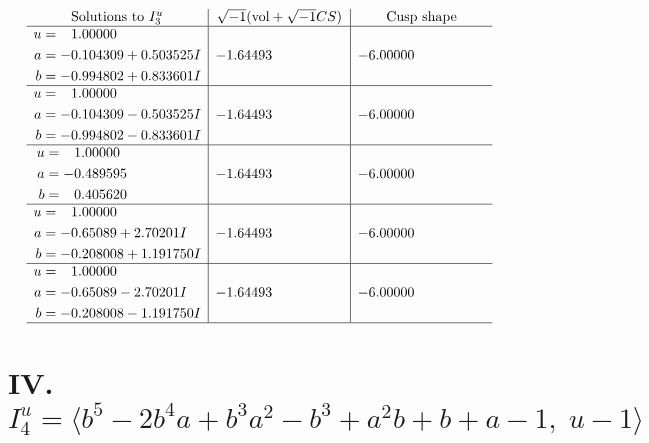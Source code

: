 \documentclass[1p]{elsarticle_modified}
\theoremstyle{definition}
\newcommand{\I}{\sqrt{-1}}
\begin{document}
$$\begin{array}{c|c|c}  
\text{Solutions to }I^u_{3}& \I (\text{vol} + \sqrt{-1}CS) & \text{Cusp shape}\\
 \hline 
\begin{aligned}
u &= \phantom{-}1.00000\phantom{ +0.000000I} \\
a &= -0.104309 + 0.503525 I \\
b &= -0.994802 + 0.833601 I\end{aligned}
 & -1.64493\phantom{ +0.000000I} & -6.00000\phantom{ +0.000000I} \\ \hline\begin{aligned}
u &= \phantom{-}1.00000\phantom{ +0.000000I} \\
a &= -0.104309 - 0.503525 I \\
b &= -0.994802 - 0.833601 I\end{aligned}
 & -1.64493\phantom{ +0.000000I} & -6.00000\phantom{ +0.000000I} \\ \hline\begin{aligned}
u &= \phantom{-}1.00000\phantom{ +0.000000I} \\
a &= -0.489595\phantom{ +0.000000I} \\
b &= \phantom{-}0.405620\phantom{ +0.000000I}\end{aligned}
 & -1.64493\phantom{ +0.000000I} & -6.00000\phantom{ +0.000000I} \\ \hline\begin{aligned}
u &= \phantom{-}1.00000\phantom{ +0.000000I} \\
a &= -0.65089 + 2.70201 I \\
b &= -0.208008 + 1.191750 I\end{aligned}
 & -1.64493\phantom{ +0.000000I} & -6.00000\phantom{ +0.000000I} \\ \hline\begin{aligned}
u &= \phantom{-}1.00000\phantom{ +0.000000I} \\
a &= -0.65089 - 2.70201 I \\
b &= -0.208008 - 1.191750 I\end{aligned}
 & -1.64493\phantom{ +0.000000I} & -6.00000\phantom{ +0.000000I}\\
 \hline 
 \end{array}$$\newpage\newpage\renewcommand{\arraystretch}{1}
\centering \section*{IV. $I^u_{4}= \langle b^5-2 b^4 a+b^3 a^2- b^3+a^2 b+b+a-1,\;u-1 \rangle$}
\end{document}

